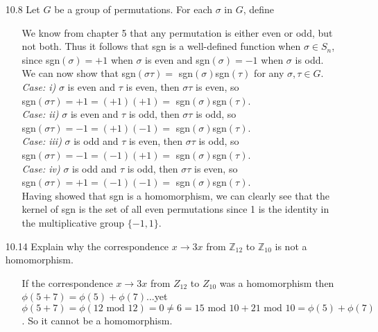 \documentclass[12pt]{article}
\begin{document}
\begin{enumerate}
\item[10.8] Let $G$ be a group of permutations. For each $\sigma$ in $G$, define
\begin{enumerate}
\item[] We know from chapter 5 that any permutation is either even or odd, but not 
both. Thus it follows that sgn is a well-defined function when $\sigma \in S_n$, 
since sgn$(\sigma ) = +1$ when $\sigma$ is even and sgn$(\sigma ) = -1$ when $\sigma$ is odd.
We can now show that sgn$(\sigma \tau) = $ sgn$(\sigma)$sgn$(\tau)$
for any $\sigma, \tau \in G$. \\
\emph{Case: i)} $\sigma$ is even and $\tau$ is even, then $\sigma \tau$ is even, so \\
sgn$(\sigma \tau) = +1 = (+1)(+1) = $ sgn$(\sigma)$sgn$(\tau)$. \\
\emph{Case: ii)} $\sigma$ is even and $\tau$ is odd, then $\sigma \tau$ is odd, so \\
sgn$(\sigma \tau) = -1 = (+1)(-1) = $ sgn$(\sigma)$sgn$(\tau)$. \\
\emph{Case: iii)} $\sigma$ is odd and $\tau$ is even, then $\sigma \tau$ is odd, so \\
sgn$(\sigma \tau) = -1 = (-1)(+1) = $ sgn$(\sigma)$sgn$(\tau)$. \\
\emph{Case: iv)} $\sigma$ is odd and $\tau$ is odd, then $\sigma \tau$ is even, so \\
sgn$(\sigma \tau) = +1 = (-1)(-1) = $ sgn$(\sigma)$sgn$(\tau)$. \\
Having showed that sgn is a homomorphism, we can clearly see that the kernel of sgn
is the set of all even permutations since 1 is the identity in the multiplicative 
group $\{-1, 1 \}$.
\end{enumerate}

\item[10.14] Explain why the correspondence $x \rightarrow 3x$ from $\mathbb{Z}_{12}$
to $\mathbb{Z}_{10}$ is not a homomorphism.
\begin{enumerate}
\item[] If the correspondence $x \rightarrow 3x$ from $Z_{12}$ to $Z_{10}$ was a homomorphism
then $\phi(5 + 7) = \phi(5) + \phi(7)$...yet \\
$\phi(5 + 7) = \phi(12 \mbox{ mod }12) = 0 \neq 6 = 15 \mbox{ mod }10 + 21 \mbox{ mod }10 = \phi(5) + \phi(7)$
. So it cannot be a homomorphism.
\end{enumerate}


\end{enumerate}
\end{document}
